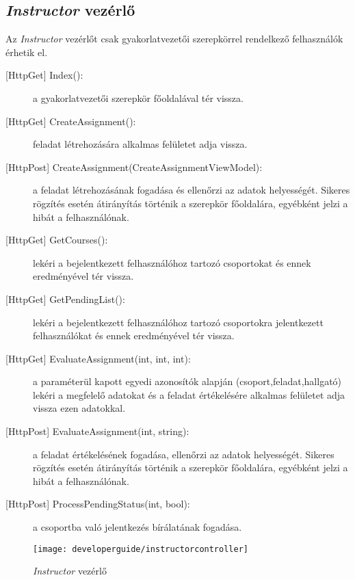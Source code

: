 \subsection{\emph{Instructor} vezérlő}
Az \emph{Instructor} vezérlőt csak gyakorlatvezetői szerepkörrel rendelkező felhasználók érhetik el.
\begin{description}
	\item[{[HttpGet]} Index():] a gyakorlatvezetői szerepkör főoldalával tér vissza.
	\item[{[HttpGet]} CreateAssignment():] feladat létrehozására alkalmas felületet adja vissza.
	\item[{[HttpPost]} CreateAssignment(CreateAssignmentViewModel):] a feladat létrehozásának fogadása és ellenőrzi az adatok helyességét. Sikeres rögzítés esetén átirányítás történik a szerepkör főoldalára, egyébként jelzi a hibát a felhasználónak.
	\item[{[HttpGet]} GetCourses():] lekéri a bejelentkezett felhasználóhoz tartozó csoportokat és ennek eredményével tér vissza.
	\item[{[HttpGet]} GetPendingList():] lekéri a bejelentkezett felhasználóhoz tartozó csoportokra jelentkezett felhasználókat és ennek eredményével tér vissza.
	\item[{[HttpGet]} EvaluateAssignment(int, int, int):] a paraméterül kapott egyedi azonosítók alapján (csoport,feladat,hallgató) lekéri a megfelelő adatokat és a feladat értékelésére alkalmas felületet adja vissza ezen adatokkal.
	\item[{[HttpPost]} EvaluateAssignment(int, string):] a feladat értékelésének fogadása, ellenőrzi az adatok helyességét. Sikeres rögzítés esetén átirányítás történik a szerepkör főoldalára, egyébként jelzi a hibát a felhasználónak.
	\item[{[HttpPost]} ProcessPendingStatus(int, bool):] a csoportba való jelentkezés bírálatának fogadása.
\end{description}
\begin{figure}[H]
	\centering
	\texttt{[image: developerguide/instructorcontroller]}
	\caption{\emph{Instructor} vezérlő}
	\label{fig:instructorcontroller}
\end{figure}
